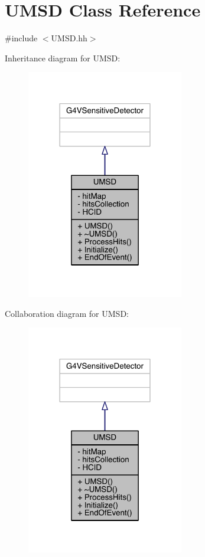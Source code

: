 \hypertarget{classUMSD}{}\section{U\+M\+S\+D Class Reference}
\label{classUMSD}


{\ttfamily \#include $<$U\+M\+S\+D.\+hh$>$}



Inheritance diagram for U\+M\+S\+D\+:
\nopagebreak
\begin{figure}[H]
\begin{center}
\leavevmode
\includegraphics[width=194pt]{classUMSD__inherit__graph}
\end{center}
\end{figure}


Collaboration diagram for U\+M\+S\+D\+:
\nopagebreak
\begin{figure}[H]
\begin{center}
\leavevmode
\includegraphics[width=194pt]{classUMSD__coll__graph}
\end{center}
\end{figure}
